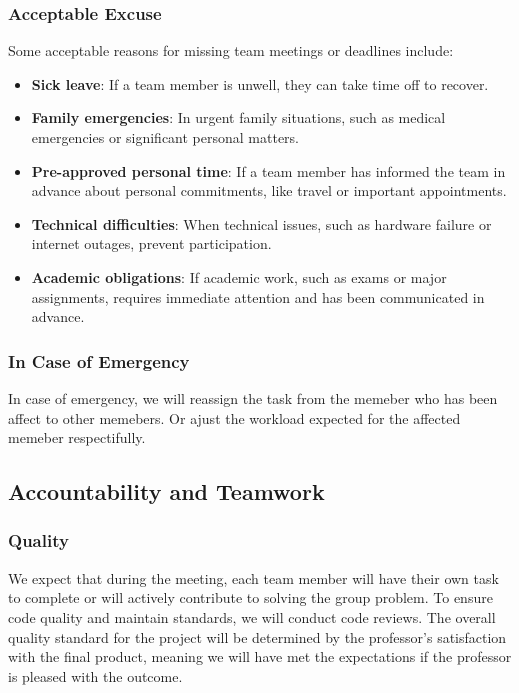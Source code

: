 \documentclass{article}
\begin{document}
\subsubsection*{Acceptable Excuse}
Some acceptable reasons for missing team meetings or deadlines include:
\begin{itemize}
    \item \textbf{Sick leave}: If a team member is unwell, they can take time off to recover.
    \item \textbf{Family emergencies}: In urgent family situations, such as medical emergencies or significant personal matters.
    \item \textbf{Pre-approved personal time}: If a team member has informed the team in advance about personal commitments, like travel or important appointments.
    \item \textbf{Technical difficulties}: When technical issues, such as hardware failure or internet outages, prevent participation.
    \item \textbf{Academic obligations}: If academic work, such as exams or major assignments, requires immediate attention and has been communicated in advance.
\end{itemize}

\subsubsection*{In Case of Emergency}

In case of emergency, we will reassign the task from the memeber who has been affect to other memebers. Or ajust the workload expected for the affected memeber respectifully.\\

\subsection*{Accountability and Teamwork}

\subsubsection*{Quality} 

We expect that during the meeting, each team member will have their own task to complete or will actively contribute to solving the group problem. To ensure code quality and maintain standards, we will conduct code reviews. The overall quality standard for the project will be determined by the professor's satisfaction with the final product, meaning we will have met the expectations if the professor is pleased with the outcome.
\end{document}
